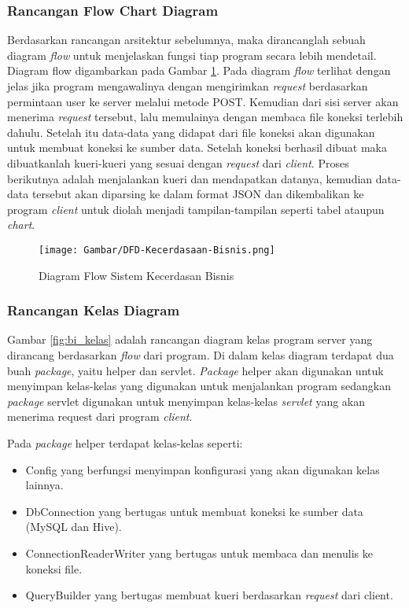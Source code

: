 \subsubsection{Rancangan Flow Chart  Diagram}
Berdasarkan rancangan arsitektur sebelumnya, maka dirancanglah sebuah diagram \textit{flow} untuk menjelaskan fungsi tiap program secara lebih mendetail. Diagram flow digambarkan pada Gambar \ref{fig:bi_flow}. Pada diagram \textit{flow} terlihat dengan jelas jika program mengawalinya dengan mengirimkan \textit{request} berdasarkan permintaan user ke server melalui metode POST. Kemudian dari sisi server akan menerima \textit{request} tersebut, lalu memulainya dengan membaca file koneksi terlebih dahulu. Setelah itu data-data yang didapat dari file koneksi akan digunakan untuk membuat koneksi ke sumber data. Setelah koneksi berhasil dibuat maka dibuatkanlah kueri-kueri yang sesuai dengan \textit{request} dari \textit{client}. Proses berikutnya adalah menjalankan kueri dan mendapatkan datanya, kemudian data-data tersebut akan diparsing ke dalam format JSON dan dikembalikan ke program \textit{client} untuk diolah menjadi tampilan-tampilan seperti tabel ataupun \textit{chart}.

\begin{figure}[H]
	\centering
	\texttt{[image: Gambar/DFD-Kecerdasaan-Bisnis.png]}
	\caption[Diagram Flow Sistem Kecerdasan Bisnis]{Diagram Flow Sistem Kecerdasan Bisnis} 
	\label{fig:bi_flow}
\end{figure}

\subsubsection{Rancangan Kelas Diagram}
Gambar \ref{fig:bi_kelas} adalah rancangan diagram kelas program server yang dirancang berdasarkan \textit{flow} dari program. Di dalam kelas diagram terdapat dua buah \textit{package}, yaitu helper dan servlet. \textit{Package} helper akan digunakan untuk menyimpan kelas-kelas yang digunakan untuk menjalankan program sedangkan \textit{package} servlet digunakan untuk menyimpan kelas-kelas \textit{servlet} yang akan menerima request dari program \textit{client}.

Pada \textit{package} helper terdapat kelas-kelas seperti:
\begin{itemize}
	\item Config yang berfungsi menyimpan konfigurasi yang akan digunakan kelas lainnya.
	\item DbConnection yang bertugas untuk membuat koneksi ke sumber data (MySQL dan Hive).
	\item ConnectionReaderWriter yang bertugas untuk membaca dan menulis ke koneksi file.
	\item QueryBuilder yang bertugas membuat kueri berdasarkan \textit{request} dari client.
\end{itemize}

